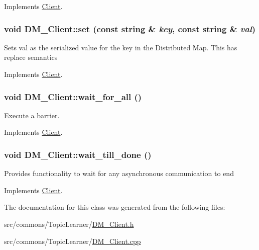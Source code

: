 Implements \hyperlink{class_client_ac60bd2cf7928c64a662fa8c0af748d0c}{Client}.

\hypertarget{class_d_m___client_aebf92e20f8ae0517bee2c956593f3748}{
\subsubsection[{set}]{\setlength{\rightskip}{0pt plus 5cm}void DM\_\-Client::set (const string \& {\em key}, \/  const string \& {\em val})}}
\label{class_d_m___client_aebf92e20f8ae0517bee2c956593f3748}
Sets val as the serialized value for the key in the Distributed Map. This has replace semantics 

Implements \hyperlink{class_client_a5efb1076768c93a53355bc7bdc8b430f}{Client}.

\hypertarget{class_d_m___client_a93c89b66097d58302c1322918ec76fca}{
\subsubsection[{wait\_\-for\_\-all}]{\setlength{\rightskip}{0pt plus 5cm}void DM\_\-Client::wait\_\-for\_\-all ()}}
\label{class_d_m___client_a93c89b66097d58302c1322918ec76fca}


Execute a barrier. 



Implements \hyperlink{class_client_af1bfd186c6afcddd19e0e6f69e1a8fc1}{Client}.

\hypertarget{class_d_m___client_a2ea7e411fb8e92febc74c90b8ab886c6}{
\subsubsection[{wait\_\-till\_\-done}]{\setlength{\rightskip}{0pt plus 5cm}void DM\_\-Client::wait\_\-till\_\-done ()}}
\label{class_d_m___client_a2ea7e411fb8e92febc74c90b8ab886c6}
Provides functionality to wait for any asynchronous communication to end 

Implements \hyperlink{class_client_a7cc1fed7f1d161586a8abef93a24b715}{Client}.



The documentation for this class was generated from the following files:\begin{DoxyCompactItemize}
\item 
src/commons/TopicLearner/\hyperlink{_d_m___client_8h}{DM\_\-Client.h}\item 
src/commons/TopicLearner/\hyperlink{_d_m___client_8cpp}{DM\_\-Client.cpp}\end{DoxyCompactItemize}

